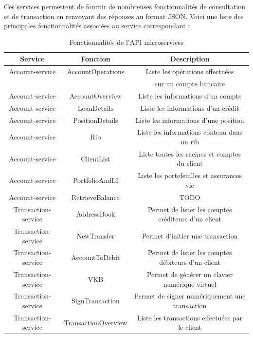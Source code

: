 	Ces services permettent de fournir de nombreuses fonctionnalités de consultation et de transaction en renvoyant des réponses au format JSON. Voici une liste des principales fonctionnalités associées au service correspondant :
	\begin{table}[h!]
	\center
	\begin{tabular}{| c | c | c |}
     \hline
     Service & Fonction & Description \\ \hline
     Account-service & AccountOperations & Liste les opérations effectuées \\ & & sur un compte bancaire \\ \hline
     Account-service & AccountOverview & Liste les informations d'un compte \\ \hline
     Account-service & LoanDetails & Liste les informations d'un crédit \\ \hline
     Account-service & PositionDetails & Liste les informations d'une position \\ \hline
     Account-service & Rib & Liste les informations contenu dans un rib \\ \hline
     Account-service & ClientList & Liste toutes les racines et comptes du client \\ \hline
     Account-service & PortfolioAndLI & Liste les portefeuilles et assurances vie \\ \hline
     Account-service & RetrieveBalance & TODO \\ \hline
     Transaction-service & AddressBook & Permet de lister les comptes créditeurs d'un client \\ \hline
     Transaction-service & NewTransfer & Permet d'initier une transaction \\ \hline
     Transaction-service & AccountToDebit & Permet de lister les comptes débiteurs d'un client \\ \hline
     Transaction-service & VKB & Permet de générer un clavier numérique virtuel \\ \hline
     Transaction-service & SignTransaction & Permet de signer numériquement une transaction \\ \hline
     Transaction-service & TransactionOverview & Liste les transactions effectuées par le client\\
     \hline
	\end{tabular}
	\caption{Fonctionnalités de l'API microservices}
	\label{fonctionnalites}
\end{table}

